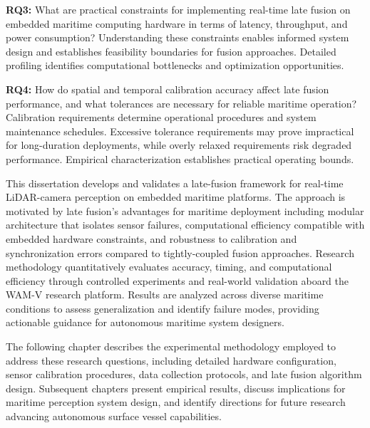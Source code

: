 \documentclass[../main.tex]{subfiles}
\begin{document}
\textbf{RQ3:} What are practical constraints for implementing real-time late fusion on embedded maritime computing hardware in terms of latency, throughput, and power consumption? Understanding these constraints enables informed system design and establishes feasibility boundaries for fusion approaches. Detailed profiling identifies computational bottlenecks and optimization opportunities.

\textbf{RQ4:} How do spatial and temporal calibration accuracy affect late fusion performance, and what tolerances are necessary for reliable maritime operation? Calibration requirements determine operational procedures and system maintenance schedules. Excessive tolerance requirements may prove impractical for long-duration deployments, while overly relaxed requirements risk degraded performance. Empirical characterization establishes practical operating bounds.

This dissertation develops and validates a late-fusion framework for real-time LiDAR-camera perception on embedded maritime platforms. The approach is motivated by late fusion's advantages for maritime deployment including modular architecture that isolates sensor failures, computational efficiency compatible with embedded hardware constraints, and robustness to calibration and synchronization errors compared to tightly-coupled fusion approaches. Research methodology quantitatively evaluates accuracy, timing, and computational efficiency through controlled experiments and real-world validation aboard the WAM-V research platform. Results are analyzed across diverse maritime conditions to assess generalization and identify failure modes, providing actionable guidance for autonomous maritime system designers.

The following chapter describes the experimental methodology employed to address these research questions, including detailed hardware configuration, sensor calibration procedures, data collection protocols, and late fusion algorithm design. Subsequent chapters present empirical results, discuss implications for maritime perception system design, and identify directions for future research advancing autonomous surface vessel capabilities.
\end{document}
